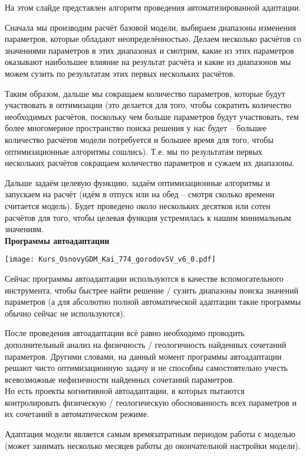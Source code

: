 На этом слайде представлен алгоритм проведения автоматизированной адаптации.

Сначала мы производим расчёт базовой модели, выбираем диапазоны изменения параметров, которые обладают неопределённостью.
Делаем несколько расчётов со значениями параметров в этих диапазонах и смотрим, какие из этих параметров оказывают наибольшее влияние на результат расчёта и какие из диапазонов мы можем сузить по результатам этих первых нескольких расчётов.

Таким образом, дальше мы сокращаем количество параметров, которые будут участвовать в оптимизации (это делается для того, чтобы сократить количество необходимых расчётов, поскольку чем больше параметров будут участвовать, тем более многомерное пространство поиска решения у нас будет -- большее количество расчётов модели потребуется и большее время для того, чтобы оптимизационные алгоритмы сошлись).
Т.е. мы по результатам первых нескольких расчётов сокращаем количество параметров и сужаем их диапазоны.

Дальше задаём целевую функцию, задаём оптимизационные алгоритмы и запускаем на расчёт (идём в отпуск или на обед -- смотря сколько времени считается модель).
Будет проведено около нескольких десятков или сотен расчётов для того, чтобы целевая функция устремилась к нашим минимальным значениям.
\\

\textbf{Программы автоадаптации}

\texttt{[image: Kurs\_OsnovyGDM\_Kai\_774\_gorodovSV\_v6\_0.pdf]}

Сейчас программы автоадаптации используются в качестве вспомогательного инструмента, чтобы быстрее найти решение / сузить диапазоны поиска значений параметров (а для абсолютно полной автоматической адаптации такие программы обычно сейчас не используются).

После проведения автоадаптации всё равно необходимо проводить дополнительный анализ на физичность / геологичность найденных сочетаний параметров.
Другими словами, на данный момент программы автоадаптации решают чисто оптимизационную задачу и не способны самостоятельно учесть всевозможные нефизичности найденных сочетаний параметров.
\\

Но есть проекты когнитивной автоадаптации, в которых пытаются контролировать физическую / геологическую обоснованность всех параметров и их сочетаний в автоматическом режиме.

Адаптация модели является самым времязатратным периодом работы с моделью (может занимать несколько месяцев работы до окончательной настройки модели).

